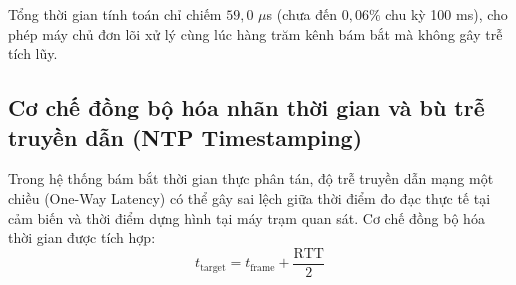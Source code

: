 \begin{table}[H]
\centering
\caption{Bảng phân bổ chi tiết ngân sách thời gian xử lý vi mô cho mỗi khung dữ liệu}
\label{tab:micro-timing-budget-breakdown}
\end{table}

Tổng thời gian tính toán chỉ chiếm $59{,}0$ $\mu$s (chưa đến $0{,}06\%$ chu kỳ 100 ms), cho phép máy chủ đơn lõi xử lý cùng lúc hàng trăm kênh bám bắt mà không gây trễ tích lũy.

\subsection{Cơ chế đồng bộ hóa nhãn thời gian và bù trễ truyền dẫn (NTP Timestamping)}

\hspace{0.5cm} Trong hệ thống bám bắt thời gian thực phân tán, độ trễ truyền dẫn mạng một chiều (One-Way Latency) có thể gây sai lệch giữa thời điểm đo đạc thực tế tại cảm biến và thời điểm dựng hình tại máy trạm quan sát. Cơ chế đồng bộ hóa thời gian được tích hợp:
\begin{equation}
t_{\text{target}} = t_{\text{frame}} + \frac{\text{RTT}}{2}
\label{eq:rtt-compensation-formula}
\end{equation}

